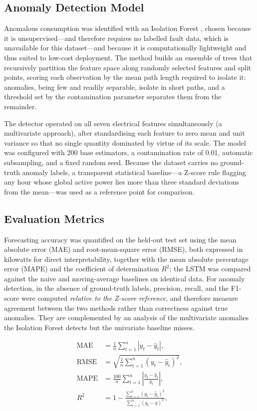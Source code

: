 \documentclass[conference]{IEEEtran}
\begin{document}
\subsection{Anomaly Detection Model}
Anomalous consumption was identified with an Isolation Forest
\cite{liu2008isolation}, chosen because it is unsupervised---and therefore
requires no labelled fault data, which is unavailable for this dataset---and
because it is computationally lightweight and thus suited to low-cost
deployment. The method builds an ensemble of trees that recursively partition
the feature space along randomly selected features and split points, scoring
each observation by the mean path length required to isolate it: anomalies,
being few and readily separable, isolate in short paths, and a threshold set by
the contamination parameter separates them from the remainder.

The detector operated on all seven electrical features simultaneously (a
multivariate approach), after standardising each feature to zero mean and unit
variance so that no single quantity dominated by virtue of its scale. The model
was configured with 200 base estimators, a contamination rate of 0.01,
automatic subsampling, and a fixed random seed. Because the dataset carries no
ground-truth anomaly labels, a transparent statistical baseline---a Z-score
rule flagging any hour whose global active power lies more than three standard
deviations from the mean---was used as a reference point for comparison.
 
\subsection{Evaluation Metrics}
Forecasting accuracy was quantified on the held-out test set using the mean
absolute error (MAE) and root-mean-square error (RMSE), both expressed in
kilowatts for direct interpretability, together with the mean absolute
percentage error (MAPE) and the coefficient of determination $R^2$; the LSTM
was compared against the naive and moving-average baselines on identical data.
For anomaly detection, in the absence of ground-truth labels, precision,
recall, and the F1-score were computed \emph{relative to the Z-score
reference}, and therefore measure agreement between the two methods rather than
correctness against true anomalies. They are complemented by an analysis of the
multivariate anomalies the Isolation Forest detects but the univariate baseline
misses.
 
\begin{align}
\mathrm{MAE} &= \frac{1}{n}\sum_{t=1}^{n}\left|y_t - \hat{y}_t\right|, \label{eq:mae}\\
\mathrm{RMSE} &= \sqrt{\frac{1}{n}\sum_{t=1}^{n}\left(y_t - \hat{y}_t\right)^2}, \label{eq:rmse}\\
\mathrm{MAPE} &= \frac{100}{n}\sum_{t=1}^{n}\left|\frac{y_t - \hat{y}_t}{y_t}\right|, \label{eq:mape}\\
R^2 &= 1 - \frac{\sum_{t=1}^{n}(y_t-\hat{y}_t)^2}{\sum_{t=1}^{n}(y_t-\bar{y})^2}, \label{eq:r2}
\end{align}
 
\end{document}
